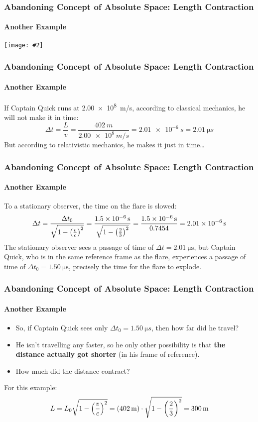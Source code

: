 \documentclass[12pt,compress,aspectratio=169]{beamer}
\newcommand{\pic}[2]{\texttt{[image: \#2]}}
\newcommand{\bigsqrt}{\ensuremath\sqrt{1-\left(\frac{v}{c}\right)^2}}
\newcommand{\eq}[2]{\vspace{#1}{\Large\begin{displaymath}#2\end{displaymath}}}
\begin{document}
\begin{frame}
  \frametitle{Abandoning Concept of Absolute Space: Length Contraction}
  \framesubtitle{Another Example}
  \begin{center}
    \pic{0.85}{graphics/captain-quick.png}
  \end{center}
\end{frame}


\begin{frame}
  \frametitle{Abandoning Concept of Absolute Space: Length Contraction}
  \framesubtitle{Another Example}
  If Captain Quick runs at \SI{2.00e8}{m/s}, according to classical mechanics,
  he will not make it in time:
  \begin{displaymath}
    \Delta t= \frac{L}{v}=\frac{\SI{402}{m}}{\SI{2.00e8}{m/s}}
    =\SI{2.01e-6}{s}=\SI{2.01}{\micro s}
  \end{displaymath}
  But according to relativistic mechanics, he makes it just in time\ldots
\end{frame}

\begin{frame}
  \frametitle{Abandoning Concept of Absolute Space: Length Contraction}
  \framesubtitle{Another Example}
  To a stationary observer, the time on the flare is slowed:
  \begin{displaymath}
    \Delta t 
    = \frac{\Delta t_0}{\bigsqrt}
    = \frac{\SI{1.5e-6}{s}}{\sqrt{1-\left(\frac{2}{3}\right)^2}}
    = \frac{\SI{1.5e-6}{s}}{0.7454}
    = \SI{2.01e-6}{s}
  \end{displaymath}
  The stationary observer sees a passage of time of
  $\Delta t=\SI{2.01}{\micro\second}$, but
  Captain Quick, who is in the same reference frame as the flare, experiences
  a passage of time of $\Delta t_0=\SI{1.50}{\micro\second}$, precisely the
  time for the flare to explode.
\end{frame}

\begin{frame}
  \frametitle{Abandoning Concept of Absolute Space: Length Contraction}
  \framesubtitle{Another Example}
  \begin{itemize}
  \item So, if Captain Quick sees only $\Delta t_0=\SI{1.50}{\micro s}$, then
    how far did he travel?
  \item He isn't travelling any faster, so he only other possibility is that
    \textbf{the distance actually got shorter} (in his frame of reference).
  \item How much did the distance contract?
  \end{itemize}
  
  \eq{-.2in}{
    \boxed{L=L_0\bigsqrt}
  }

  For this example:
  \begin{displaymath}
    L=L_0\bigsqrt=(\SI{402}{m})\cdot\sqrt{1-\left(\frac{2}{3}\right)^2}
    =\SI{300}{m}
  \end{displaymath}
\end{frame}
\end{document}
